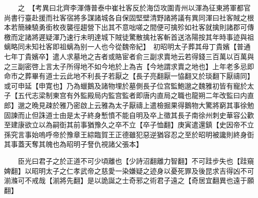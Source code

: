 　　之　【考異曰北齊李渾傳普泰中崔社客反於海岱攻圍青州以渾為征東將軍都官尚書行臺赴援而社客宿將多謀諸城各自保固堅壁清野諸將議有異同渾曰社客賊之根本若簡練驍勇銜枚夜襲徑趨營下出其不意咄嗟之間便可擒殄如社客就擒則諸郡可傳檄而定諸將遲疑渾乃速行未明達城下賊徒驚散擒社客斬首送洛陽按其年時事迹與祖螭略同未知社客即祖螭為别一人也今從魏帝紀】　初昭明太子葬其母丁貴嬪【普通七年丁貴嬪卒】遣人求墓地之吉者或賂宦者俞三副求賣地云若得錢三百萬以百萬與之三副密啓上言太子所得地不如今地於上為吉【今地謂求賣之地也】上年老多忌即命市之葬畢有道士云此地不利長子若厭之【長子亮翻厭一恊翻又於琰翻下厭禱同】或可申延【申寛也】乃為蠟鵝及諸物埋於墓側長子位宫監鮑邈之魏雅初皆有寵於太子【五代志梁制東宫有外監殿局内監宫監者即唐内直局之職也龍朔二年改監曰内直郎】邈之晩見疎於雅乃密啟上云雅為太子厭禱上遣檢掘果得鵝物大驚將窮其事徐勉固諫而止但誅道士由是太子終身慙憤不能自明及卒上徵其長子南徐州刺史華容公歡至建康欲立以為嗣衘其前事猶豫久之卒不立【卒子恤翻】庚寅遣還鎮【史因帝不立孫究言事始嗚呼帝於豫章王綜臨賀王正德雖犯惡逆猶容忍之至於昭明被讒則終身衘其事蓋天奪其魄也為昭明子詧仇視諸父張本】

　　臣光曰君子之於正道不可少頃離也【少詩沼翻離力智翻】不可跬步失也【跬窺婢翻】以昭明太子之仁孝武帝之慈愛一染嫌疑之迹身以憂死罪及後昆求吉得凶不可湔滌可不戒哉【湔將先翻】是以詭誕之士奇邪之術君子遠之【奇居宜翻異也遠于願翻】

